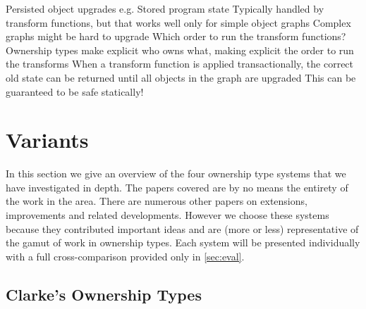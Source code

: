 \documentclass{acm_proc_article-sp}
\begin{document}
Persisted object upgrades e.g. Stored program state Typically handled by
transform functions, but that works well only for simple object graphs Complex
graphs might be hard to upgrade Which order to run the transform functions?
Ownership types make explicit who owns what, making explicit the order to run
the transforms When a transform function is applied transactionally, the
correct old state can be returned until all objects in the graph are upgraded
This can be guaranteed to be safe statically!




\section{Variants}
\label{sec:variants}

In this section we give an overview of the four ownership type systems that we
have investigated in depth. The papers covered are by no means the entirety of
the work in the area. There are numerous other papers on extensions,
improvements and related developments. However we choose these systems because
they contributed important ideas and are (more or less) representative of the
gamut of work in ownership types. Each system will be presented individually
with a full cross-comparison provided only in \cref{sec:eval}.

\subsection{Clarke's Ownership Types}
\label{subsec:clarke}
\end{document}

